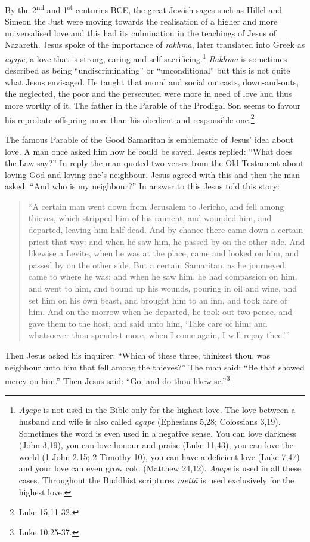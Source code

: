 \documentclass[10pt, openright]{book}
\begin{document}
By the 2\textsuperscript{nd} and 1\textsuperscript{st} centuries BCE, the great Jewish sages such as Hillel and Simeon the Just were moving towards the realisation of a higher and more universalised love and this had its culmination in the teachings of Jesus of Nazareth. Jesus spoke of the importance of \textit{rakhma}, later translated into Greek as \textit{agape}, a love that is strong, caring and self-sacrificing.\footnote {\textit{Agape} is not used in the Bible only for the highest love. The love between a husband and wife is also called \textit{agape} (Ephesians 5,28; Colossians 3,19). Sometimes the word is even used in a negative sense. You can love darkness (John 3,19), you can love honour and praise (Luke 11,43), you can love the world (1 John 2.15; 2 Timothy 10), you can have a deficient love (Luke 7,47) and your love can even grow cold (Matthew 24,12). \textit{Agape} is used in all these cases. Throughout the Buddhist scriptures \textit{mettā} is used exclusively for the highest love.} \textit{Rakhma} is sometimes described as being “undiscriminating” or “unconditional” but this is not quite what Jesus envisaged. He taught that moral and social outcasts, down-and-outs, the neglected, the poor and the persecuted were more in need of love and thus more worthy of it. The father in the Parable of the Prodigal Son seems to favour his reprobate offspring more than his obedient and responsible one.\footnote {Luke 15,11-32.}


The famous Parable of the Good Samaritan is emblematic of Jesus’ idea about love. A man once asked him how he could be saved. Jesus replied: “What does the Law say?” In reply the man quoted two verses from the Old Testament about loving God and loving one’s neighbour. Jesus agreed with this and then the man asked: “And who is my neighbour?” In answer to this Jesus told this story:


\begin{quote}


“A certain man went down from Jerusalem to Jericho, and fell among thieves, which stripped him of his raiment, and wounded him, and departed, leaving him half dead. And by chance there came down a certain priest that way: and when he saw him, he passed by on the other side. And likewise a Levite, when he was at the place, came and looked on him, and passed by on the other side. But a certain Samaritan, as he journeyed, came to where he was: and when he saw him, he had compassion on him, and went to him, and bound up his wounds, pouring in oil and wine, and set him on his own beast, and brought him to an inn, and took care of him. And on the morrow when he departed, he took out two pence, and gave them to the host, and said unto him, ‘Take care of him; and whatsoever thou spendest more, when I come again, I will repay thee.’”




\end{quote}
Then Jesus asked his inquirer: “Which of these three, thinkest thou, was neighbour unto him that fell among the thieves?” The man said: “He that showed mercy on him.” Then Jesus said: “Go, and do thou likewise.”\footnote {Luke 10,25-37.}
\end{document}
